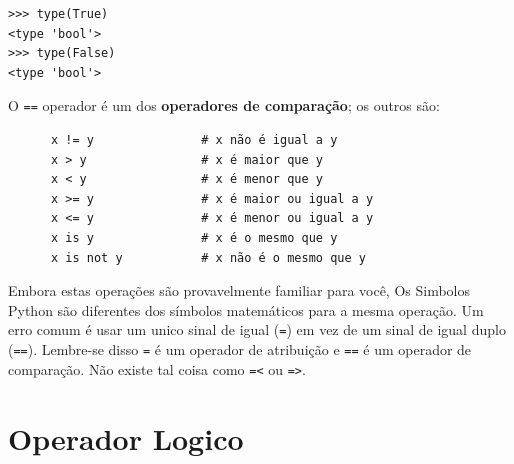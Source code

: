 \beforeverb
\begin{verbatim}
>>> type(True)
<type 'bool'>
>>> type(False)
<type 'bool'>
\end{verbatim}
\afterverb
%

O {\tt ==} operador é um dos  {\bf operadores de comparação}; os
outros são:

\beforeverb
\begin{verbatim}
      x != y               # x não é igual a y
      x > y                # x é maior que y
      x < y                # x é menor que y
      x >= y               # x é maior ou igual a y
      x <= y               # x é menor ou igual a y
      x is y               # x é o mesmo que y
      x is not y           # x não é o mesmo que y
\end{verbatim}
\afterverb

%


Embora estas operações são provavelmente familiar para você, Os Simbolos
Python são diferentes dos símbolos matemáticos para a mesma 
operação.  Um erro comum
é usar um unico sinal de igual ({\tt =}) em vez de um sinal de igual duplo
({\tt ==}).  Lembre-se disso {\tt =} é um operador de atribuição e 
{\tt ==} é um operador de comparação.   Não existe tal coisa como
{\tt =<} ou {\tt =>}.




\section {Operador Logico}

